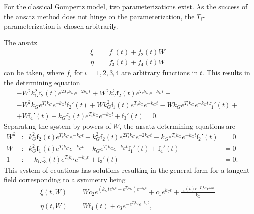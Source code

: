For the classical Gompertz model, two parameterizations exist.
As the success of the ansatz method does not hinge on the parameterization, the \(T_i\)-parameterization is chosen arbitrarily.

The ansatz
\begin{align*}
  \xi &= f_{1}(t) + f_{2}(t) W \\
  \eta &= f_{3}(t) + f_{4}(t) W
\end{align*}
can be taken, where \(f_i\) for \(i =1,2,3,4\) are arbitrary functions in \(t\).
This results in the determining equation
\begin{multline*}
  - W^{2} k_{G}^{2} \operatorname{f_{2}}{\left(t \right)} e^{2 T_{i} k_{G}} e^{- 2 k_{G} t} + W^{2} k_{G}^{2} \operatorname{f_{2}}{\left(t \right)} e^{T_{i} k_{G}} e^{- k_{G} t} -\\- W^{2} k_{G} e^{T_{i} k_{G}} e^{- k_{G} t} \operatorname{f_{2}}'{\left(t \right)} + W k_{G}^{2} \operatorname{f_{1}}{\left(t \right)} e^{T_{i} k_{G}} e^{- k_{G} t} - W k_{G} e^{T_{i} k_{G}} e^{- k_{G} t} \operatorname{f_{1}}'{\left(t \right)} +\\+ W \operatorname{f_{4}}'{\left(t \right)} - k_{G} \operatorname{f_{3}}{\left(t \right)} e^{T_{i} k_{G}} e^{- k_{G} t} + \operatorname{f_{3}}'{\left(t \right)} = 0.
\end{multline*}
Separating the system by powers of \(W\), the ansatz determining equations are
\begin{subequations}
  \begin{flalign*}
    W^2 & : &  k_{G}^{2} \operatorname{f_{2}}{\left(t \right)} e^{T_{i} k_{G}} e^{- k_{G} t} - k_{G}^{2} \operatorname{f_{2}}{\left(t \right)} e^{2 T_{i} k_{G}} e^{- 2 k_{G} t} - k_{G} e^{T_{i} k_{G}} e^{- k_{G} t} \operatorname{f_{2}}'{\left(t \right)} &= 0 &&\\
    W & : & k_{G}^{2} \operatorname{f_{1}}{\left(t \right)} e^{T_{i} k_{G}} e^{- k_{G} t} - k_{G} e^{T_{i} k_{G}} e^{- k_{G} t} \operatorname{f_{1}}'{\left(t \right)} + \operatorname{f_{4}}'{\left(t \right)} &= 0 && \\
    1 & : & - k_{G} \operatorname{f_{3}}{\left(t \right)} e^{T_{i} k_{G}} e^{- k_{G} t} + \operatorname{f_{3}}'{\left(t \right)} &= 0. &&
  \end{flalign*}
\end{subequations}
This system of equations has solutions resulting in the general form for a tangent field corresponding to a symmetry being
\begin{align*}
  \xi{\left(t,W \right)} &= W c_{2} e^{\left(k_{G} t e^{k_{G} t} + e^{T_{i} k_{G}}\right) e^{- k_{G} t}} + c_{1} e^{k_{G} t} + \frac{\operatorname{f_{4}}{\left(t \right)} e^{- T_{i} k_{G}} e^{k_{G} t}}{k_{G}} \\
  \eta{\left(t,W \right)} &= W \operatorname{f_{4}}{\left(t \right)} + c_{3} e^{- e^{T_{i} k_{G}} e^{- k_{G} t}},
\end{align*}
